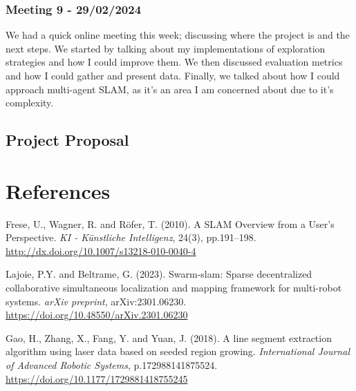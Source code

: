 \documentclass[12pt]{article}
\begin{document}
\subsubsection{Meeting 9 - 29/02/2024}
We had a quick online meeting this week; discussing where the project is and the next steps. We started by talking about
my implementations of exploration strategies and how I could improve them. We then discussed evaluation metrics and how I
could gather and present data. Finally, we talked about how I could approach multi-agent SLAM, as it's an area I am concerned
about due to it's complexity.

\subsection{Project Proposal}


\section{References}

\begin{thebibliography}{9}

    Frese, U., Wagner, R. and Röfer, T. (2010). A SLAM Overview from a User’s Perspective.
    \textit{KI - Künstliche Intelligenz}, 24(3), pp.191–198.
    \href{http://dx.doi.org/10.1007/s13218-010-0040-4}{http://dx.doi.org/10.1007/s13218-010-0040-4}

    Lajoie, P.Y. and Beltrame, G. (2023). Swarm-slam: Sparse decentralized collaborative simultaneous localization and mapping framework for multi-robot systems.
    \textit{arXiv preprint},  arXiv:2301.06230.
    \href{https://doi.org/10.48550/arXiv.2301.06230}{https://doi.org/10.48550/arXiv.2301.06230}

    Gao, H., Zhang, X., Fang, Y. and Yuan, J. (2018). A line segment extraction algorithm using laser data based on seeded region growing.
    \textit{ International Journal of Advanced Robotic Systems}, p.172988141875524.
    \href{https://doi.org/10.1177/1729881418755245}{https://doi.org/10.1177/1729881418755245}

\end{thebibliography}
\end{document}
